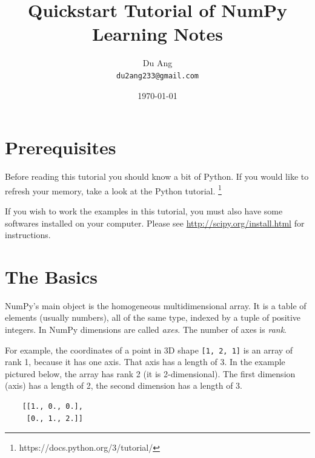 \documentclass[UTF8]{article}
\title{Quickstart Tutorial of NumPy \\
        Learning Notes}
\author{Du Ang \\ \texttt{du2ang233@gmail.com} }
\date{\today}
\begin{document}
\maketitle

\tableofcontents
\newpage

\section{Prerequisites}
Before reading this tutorial you should know a bit of Python. If you would like to refresh your
memory, take a look at the Python tutorial.
\footnote{https://docs.python.org/3/tutorial/}

If you wish to work the examples in this tutorial, you must also have some softwares installed on
your computer. Please see \url{http://scipy.org/install.html} for instructions.

\section{The Basics}
NumPy's main object is the homogeneous multidimensional array. It is a table of elements (usually
numbers), all of the same type, indexed by a tuple of positive integers. In NumPy dimensions are
called \emph{axes}. The number of axes is \emph{rank}.

For example, the coordinates of a point in 3D shape \texttt{[1, 2, 1]} is an array of rank 1,
because it has one axis. That axis has a length of 3. In the example pictured below, the array has
rank 2 (it is 2-dimensional). The first dimension (axis) has a length of 2, the second dimension
has a length of 3.
\begin{verbatim}
    [[1., 0., 0.],
     [0., 1., 2.]]
\end{verbatim}
\end{document}
